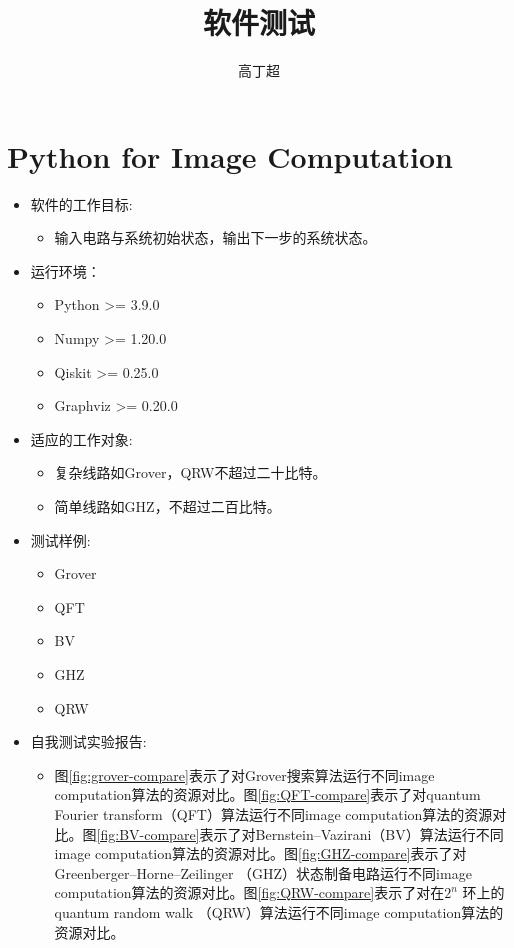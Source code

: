 \documentclass{article}
\title{软件测试}
\author{高丁超} %
\date{} %
\begin{document}
\maketitle
\linespread{1.5}
\section{Python for Image Computation}
\begin{itemize}[leftmargin=*]
    \item 软件的工作目标: 
    \begin{itemize}
        \item 输入电路与系统初始状态，输出下一步的系统状态。
    \end{itemize}
    \item 运行环境：
    \begin{itemize}
        \item Python >= 3.9.0
        \item Numpy >= 1.20.0
        \item Qiskit >= 0.25.0
        \item Graphviz >= 0.20.0
    \end{itemize} 
    \item 适应的工作对象:
    \begin{itemize}
        \item 复杂线路如Grover，QRW不超过二十比特。
        \item 简单线路如GHZ，不超过二百比特。
    \end{itemize}
    \item 测试样例:
    \begin{itemize}
        \item Grover
        \item QFT
        \item BV
        \item GHZ
        \item QRW
    \end{itemize}
    \item 自我测试实验报告:
    \begin{itemize}
        \item  \linespread{1.5}图\ref{fig:grover-compare}表示了对Grover搜索算法运行不同image computation算法的资源对比。图\ref{fig:QFT-compare}表示了对quantum Fourier transform（QFT）算法运行不同image computation算法的资源对比。图\ref{fig:BV-compare}表示了对Bernstein–Vazirani（BV）算法运行不同image computation算法的资源对比。图\ref{fig:GHZ-compare}表示了对Greenberger–Horne–Zeilinger （GHZ）状态制备电路运行不同image computation算法的资源对比。图\ref{fig:QRW-compare}表示了对在$2^n$ 环上的quantum random walk （QRW）算法运行不同image computation算法的资源对比。

\end{itemize}
\end{itemize}
\end{document}
